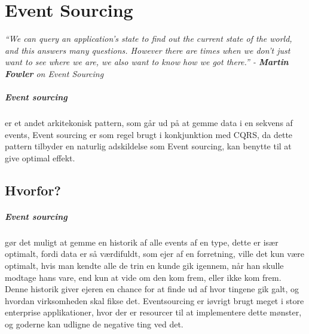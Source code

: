 \chapter{Event Sourcing}

\textit{``We can query an application's state to find out the current state of the world, and this answers many questions. However there are times when we don't just want to see where we are, we also want to know how we got there.'' - \textbf{Martin Fowler} on Event Sourcing}

\paragraph{Event sourcing}
  
er et andet arkitekonisk pattern, som går ud på at gemme data i en sekvens af events, Event sourcing er som regel brugt i konkjunktion med CQRS, da dette pattern tilbyder en naturlig adskildelse som Event sourcing, kan benytte til at give optimal effekt.

\section{Hvorfor?}

\paragraph{Event sourcing} gør det muligt at gemme en historik af alle events af en type, dette er især optimalt, fordi data er så værdifuldt, som ejer af en forretning, ville det kun være optimalt, hvis man kendte alle de trin en kunde gik igennem, når han skulle modtage hans vare, end kun at vide om den kom frem, eller ikke kom frem. Denne historik giver ejeren en chance for at finde ud af hvor tingene gik galt, og hvordan virksomheden skal fikse det. Eventsourcing er iøvrigt brugt meget i store enterprise applikationer, hvor der er resourcer til at implementere dette mønster, og goderne kan udligne de negative ting ved det. 

